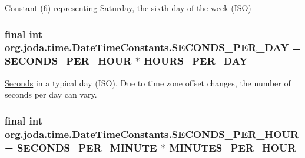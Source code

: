 Constant (6) representing Saturday, the sixth day of the week (I\-S\-O) \hypertarget{classorg_1_1joda_1_1time_1_1_date_time_constants_a9563adbae20b30723a374befd0d2c7be}{
\subsubsection[{S\-E\-C\-O\-N\-D\-S\-\_\-\-P\-E\-R\-\_\-\-D\-A\-Y}]{\setlength{\rightskip}{0pt plus 5cm}final int org.\-joda.\-time.\-Date\-Time\-Constants.\-S\-E\-C\-O\-N\-D\-S\-\_\-\-P\-E\-R\-\_\-\-D\-A\-Y = {\bf S\-E\-C\-O\-N\-D\-S\-\_\-\-P\-E\-R\-\_\-\-H\-O\-U\-R} $\ast$ {\bf H\-O\-U\-R\-S\-\_\-\-P\-E\-R\-\_\-\-D\-A\-Y}\hspace{0.3cm}{\ttfamily [static]}}}\label{classorg_1_1joda_1_1time_1_1_date_time_constants_a9563adbae20b30723a374befd0d2c7be}
\hyperlink{classorg_1_1joda_1_1time_1_1_seconds}{Seconds} in a typical day (I\-S\-O). Due to time zone offset changes, the number of seconds per day can vary. \hypertarget{classorg_1_1joda_1_1time_1_1_date_time_constants_ae2282313c878e3f3ad90d3e24c665ed0}{
\subsubsection[{S\-E\-C\-O\-N\-D\-S\-\_\-\-P\-E\-R\-\_\-\-H\-O\-U\-R}]{\setlength{\rightskip}{0pt plus 5cm}final int org.\-joda.\-time.\-Date\-Time\-Constants.\-S\-E\-C\-O\-N\-D\-S\-\_\-\-P\-E\-R\-\_\-\-H\-O\-U\-R = {\bf S\-E\-C\-O\-N\-D\-S\-\_\-\-P\-E\-R\-\_\-\-M\-I\-N\-U\-T\-E} $\ast$ {\bf M\-I\-N\-U\-T\-E\-S\-\_\-\-P\-E\-R\-\_\-\-H\-O\-U\-R}\hspace{0.3cm}{\ttfamily [static]}}}\label{classorg_1_1joda_1_1time_1_1_date_time_constants_ae2282313c878e3f3ad90d3e24c665ed0}
